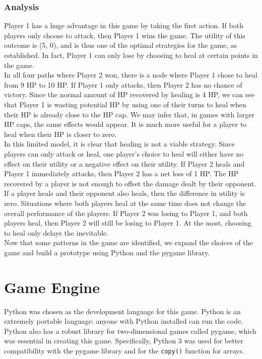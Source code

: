 \subsubsection{Analysis}
Player 1 has a huge advantage in this game by taking the first action. If both players only choose to attack, then Player 1 wins the game. The utility of this outcome is (5, 0), and is thus one of the optimal strategies for the game, as established. In fact, Player 1 can only lose by choosing to heal at certain points in the game.\\

In all four paths where Player 2 won, there is a node where Player 1 chose to heal from 9 HP to 10 HP. If Player 1 only attacks, then Player 2 has no chance of victory. Since the normal amount of HP recovered by healing is 4 HP, we can see that Player 1 is wasting potential HP by using one of their turns to heal when their HP is already close to the HP cap. We may infer that, in games with larger HP caps, the same effects would appear. It is much more useful for a player to heal when their HP is closer to zero.\\

In this limited model, it is clear that healing is not a viable strategy. Since players can only attack or heal, one player's choice to heal will either have no effect on their utility or a negative effect on their utility. If Player 2 heals and Player 1 immediately attacks, then Player 2 has a net loss of 1 HP. The HP recovered by a player is not enough to offset the damage dealt by their opponent. If a player heals and their opponent also heals, then the difference in utility is zero. Situations where both players heal at the same time does not change the overall performance of the players. If Player 2 was losing to Player 1, and both players heal, then Player 2 will still be losing to Player 1. At the most, choosing to heal only delays the inevitable.\\

Now that some patterns in the game are identified, we expand the choices of the game and build a prototype using Python and the pygame library.

\section{Game Engine}
Python was chosen as the development language for this game. Python is an extremely portable language: anyone with Python installed can run the code. Python also has a robust library for two-dimensional games called pygame, which was essential in creating this game. Specifically, Python 3 was used for better compatibility with the pygame library and for the \texttt{copy()} function for arrays.

